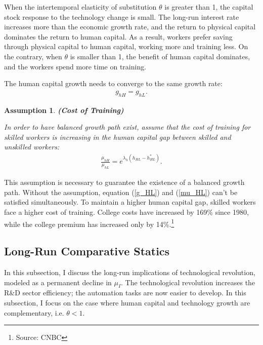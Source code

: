 \documentclass[12pt]{article}
\newtheorem{assumption}{Assumption}
\begin{document}
When the intertemporal elasticity of substitution $\theta$ is greater than 1, the capital stock response to the technology change is small. The long-run interest rate increases more than the economic growth rate, and the return to physical capital dominates the return to human capital. As a result, workers prefer saving through physical capital to human capital, working more and training less. On the contrary, when $\theta$ is smaller than 1, the benefit of human capital dominates, and the workers spend more time on training. 

The human capital growth needs to converge to the same growth rate: 
\begin{align}
\label{g_HL}
g_{hH} = g_{hL}.
\end{align}

\begin{assumption}{\bf (Cost of Training)}

In order to have balanced growth path exist, assume that the cost of training for skilled workers is increasing in the human capital gap between skilled and unskilled workers: 
\begin{align}
\label{mu_HL}
\frac{\mu_{hH}}{\mu_{hL}} = e^{\lambda_h(h_{HL}-h_{HL}^*)}.
\end{align}
\end{assumption}

This assumption is necessary to guarantee the existence of a balanced growth path. Without the assumption, equation (\ref{g_HL}) and (\ref{mu_HL}) can't be satisfied simultaneously. To maintain a higher human capital gap, skilled workers face a higher cost of training. College costs have increased by 169\% since 1980, while the college premium has increased only by 14\%.\footnote{Source: CNBC}


\subsection{Long-Run Comparative Statics}
In this subsection, I discuss the long-run implications of technological revolution, modeled as a permanent decline in $\mu_I$. The technological revolution increases the R\&D sector efficiency; the automation tasks are now easier to develop. In this subsection, I focus on the case where human capital and technology growth are complementary, i.e. $\theta<1$. 
\end{document}
